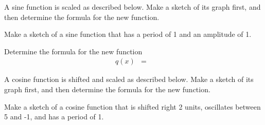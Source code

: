 \begin{problem}
\clearpage

\item A sine function is scaled as described below. Make a sketch of
  its graph first, and then determine the formula for the new
  function.
  \begin{subproblem}
  \item Make a sketch of a sine function that has a period of 1 and an
    amplitude of 1.

    \hspace*{-3.5em}


  \item Determine the formula for the new function
    \begin{eqnarray*}
        q(x) & = &
    \end{eqnarray*}
  \end{subproblem}

\item A cosine function is shifted and scaled as described
  below. Make a sketch of its graph first, and then determine the
  formula for the new function.
  \begin{subproblem}
  \item Make a sketch of a cosine function that is shifted right
    2 units, oscillates between 5 and -1, and has a period of 1.


\end{subproblem}
\end{problem}

